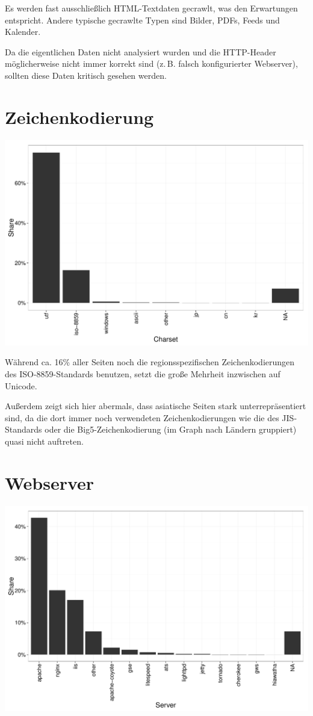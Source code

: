 \documentclass[a4paper,12pt,titlepage=false]{scrreprt}
\begin{document}
Es werden fast ausschließlich HTML-Textdaten gecrawlt, was den Erwartungen entspricht. Andere typische gecrawlte Typen sind Bilder, PDFs, Feeds und Kalender.

Da die eigentlichen Daten nicht analysiert wurden und die HTTP-Header möglicherweise nicht immer korrekt sind (z.\,B. falsch konfigurierter Webserver), sollten diese Daten kritisch gesehen werden.

\clearpage

\section{Zeichenkodierung}

\begin{center}
    \includegraphics[width=.78\textwidth]{plots/plot_charset}
\end{center}

\noindent
Während ca. 16\% aller Seiten noch die regionsspezifischen Zeichenkodierungen des ISO-8859-Standards benutzen, setzt die große Mehrheit inzwischen auf Unicode.

Außerdem zeigt sich hier abermals, dass asiatische Seiten stark unterrepräsentiert sind, da die dort immer noch verwendeten Zeichenkodierungen wie die des JIS-Standards oder die Big5-Zeichenkodierung (im Graph nach Ländern gruppiert) quasi nicht auftreten.

\section{Webserver}

\begin{center}
    \includegraphics[width=.78\textwidth]{plots/plot_server}
\end{center}
\end{document}
